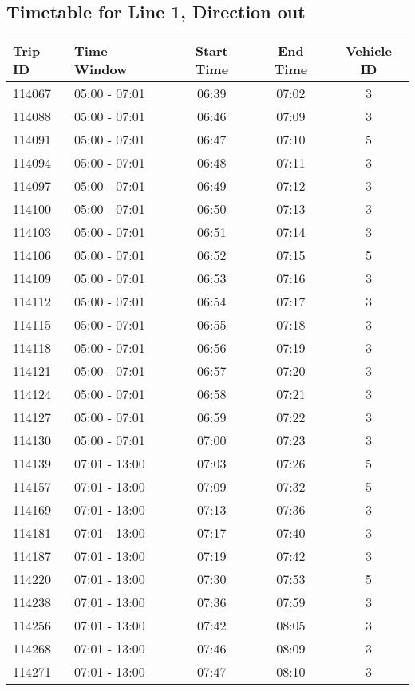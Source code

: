 \documentclass{article}
\begin{document}
\subsection*{Timetable for Line 1, Direction out}
\begin{tabular}{llccc}
\toprule
Trip ID & Time Window & Start Time & End Time & Vehicle ID \\
\midrule
114067 & 05:00 - 07:01 & 06:39 & 07:02 & 3 \\
114088 & 05:00 - 07:01 & 06:46 & 07:09 & 3 \\
114091 & 05:00 - 07:01 & 06:47 & 07:10 & 5 \\
114094 & 05:00 - 07:01 & 06:48 & 07:11 & 3 \\
114097 & 05:00 - 07:01 & 06:49 & 07:12 & 3 \\
114100 & 05:00 - 07:01 & 06:50 & 07:13 & 3 \\
114103 & 05:00 - 07:01 & 06:51 & 07:14 & 3 \\
114106 & 05:00 - 07:01 & 06:52 & 07:15 & 5 \\
114109 & 05:00 - 07:01 & 06:53 & 07:16 & 3 \\
114112 & 05:00 - 07:01 & 06:54 & 07:17 & 3 \\
114115 & 05:00 - 07:01 & 06:55 & 07:18 & 3 \\
114118 & 05:00 - 07:01 & 06:56 & 07:19 & 3 \\
114121 & 05:00 - 07:01 & 06:57 & 07:20 & 3 \\
114124 & 05:00 - 07:01 & 06:58 & 07:21 & 3 \\
114127 & 05:00 - 07:01 & 06:59 & 07:22 & 3 \\
114130 & 05:00 - 07:01 & 07:00 & 07:23 & 3 \\
114139 & 07:01 - 13:00 & 07:03 & 07:26 & 5 \\
114157 & 07:01 - 13:00 & 07:09 & 07:32 & 5 \\
114169 & 07:01 - 13:00 & 07:13 & 07:36 & 3 \\
114181 & 07:01 - 13:00 & 07:17 & 07:40 & 3 \\
114187 & 07:01 - 13:00 & 07:19 & 07:42 & 3 \\
114220 & 07:01 - 13:00 & 07:30 & 07:53 & 5 \\
114238 & 07:01 - 13:00 & 07:36 & 07:59 & 3 \\
114256 & 07:01 - 13:00 & 07:42 & 08:05 & 3 \\
114268 & 07:01 - 13:00 & 07:46 & 08:09 & 3 \\
114271 & 07:01 - 13:00 & 07:47 & 08:10 & 3 \\

\end{tabular}
\end{document}
